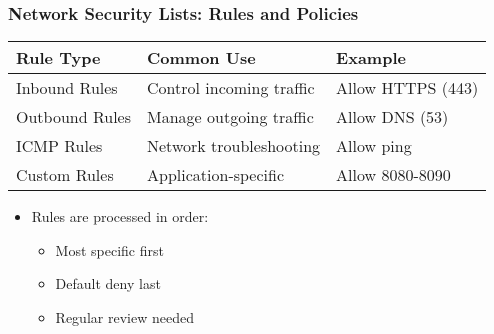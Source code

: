 \documentclass{beamer}
\begin{document}
\begin{frame}
    \frametitle{Network Security Lists: Rules and Policies}
    
    \begin{tabular}{|p{}|p{}|p{}|}
        \hline
        \textbf{Rule Type} & \textbf{Common Use} & \textbf{Example} \\
        \hline
        Inbound Rules & Control incoming traffic & Allow HTTPS (443) \\
        \hline
        Outbound Rules & Manage outgoing traffic & Allow DNS (53) \\
        \hline
        ICMP Rules & Network troubleshooting & Allow ping \\
        \hline
        Custom Rules & Application-specific & Allow 8080-8090 \\
        \hline
    \end{tabular}
    
    \begin{itemize}
        \item Rules are processed in order:
        \begin{itemize}
            \item Most specific first
            \item Default deny last
            \item Regular review needed
        \end{itemize}
    \end{itemize}
\end{frame}
\end{document}
